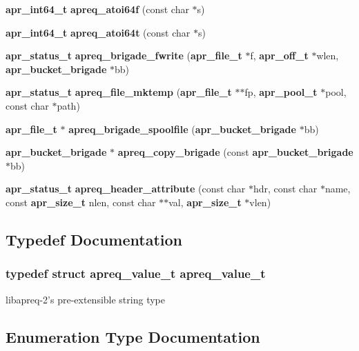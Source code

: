 \begin{CompactItemize}
\item 
{\bf apr\_\-int64\_\-t} {\bf apreq\_\-atoi64f} (const char $\ast$s)
\item 
{\bf apr\_\-int64\_\-t} {\bf apreq\_\-atoi64t} (const char $\ast$s)
\item 
{\bf apr\_\-status\_\-t} {\bf apreq\_\-brigade\_\-fwrite} ({\bf apr\_\-file\_\-t} $\ast$f, {\bf apr\_\-off\_\-t} $\ast$wlen, {\bf apr\_\-bucket\_\-brigade} $\ast$bb)
\item 
{\bf apr\_\-status\_\-t} {\bf apreq\_\-file\_\-mktemp} ({\bf apr\_\-file\_\-t} $\ast$$\ast$fp, {\bf apr\_\-pool\_\-t} $\ast$pool, const char $\ast$path)
\item 
{\bf apr\_\-file\_\-t} $\ast$ {\bf apreq\_\-brigade\_\-spoolfile} ({\bf apr\_\-bucket\_\-brigade} $\ast$bb)
\item 
{\bf apr\_\-bucket\_\-brigade} $\ast$ {\bf apreq\_\-copy\_\-brigade} (const {\bf apr\_\-bucket\_\-brigade} $\ast$bb)\label{group__Utils_a21}

\item 
{\bf apr\_\-status\_\-t} {\bf apreq\_\-header\_\-attribute} (const char $\ast$hdr, const char $\ast$name, const {\bf apr\_\-size\_\-t} nlen, const char $\ast$$\ast$val, {\bf apr\_\-size\_\-t} $\ast$vlen)\label{group__Utils_a22}

\end{CompactItemize}


\subsection{Typedef Documentation}
\subsubsection{\setlength{\rightskip}{0pt plus 5cm}typedef struct apreq\_\-value\_\-t  apreq\_\-value\_\-t}\label{group__Utils_a0}


libapreq-2's pre-extensible string type 

\subsection{Enumeration Type Documentation}
